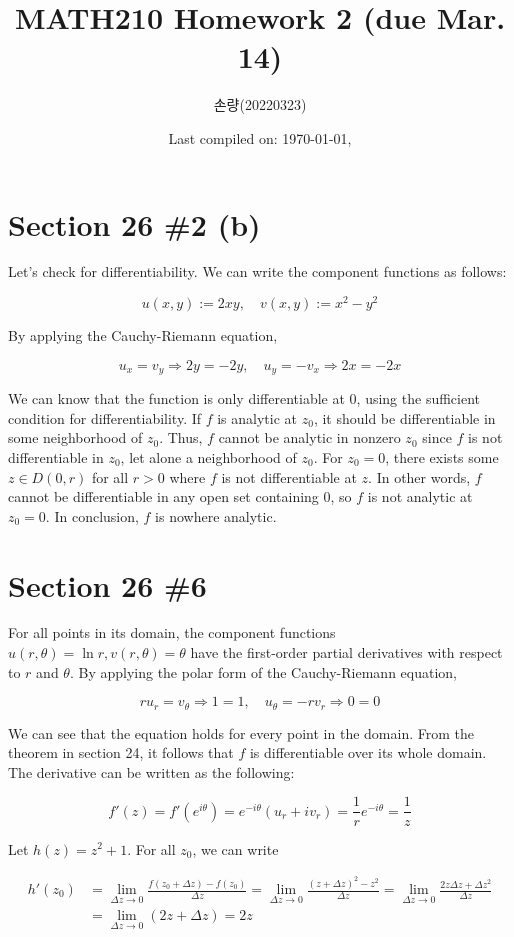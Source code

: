 \documentclass{scrartcl}
\title{MATH210 Homework 2 (due Mar. 14)}
\author{손량(20220323)}
\date{Last compiled on: \today, \currenttime}
\begin{document}
\maketitle

\section{Section 26 \#2 (b)}
Let's check for differentiability.
We can write the component functions as follows:

\[
  u(x, y) := 2xy, \quad v(x, y) := x^2 - y^2
\]

By applying the Cauchy-Riemann equation,

\[
  u_x = v_y \Longrightarrow 2y = -2y, \quad u_y = -v_x \Longrightarrow 2x = -2x
\]

We can know that the function is only differentiable at \(0\), using the sufficient condition for differentiability.
If \(f\) is analytic at \(z_0\), it should be differentiable in some neighborhood of \(z_0\).
Thus, \(f\) cannot be analytic in nonzero \(z_0\) since \(f\) is not differentiable in \(z_0\), let alone a neighborhood of \(z_0\).
For \(z_0 = 0\), there exists some \(z \in D(0, r)\) for all \(r > 0\) where \(f\) is not differentiable at \(z\).
In other words, \(f\) cannot be differentiable in any open set containing \(0\), so \(f\) is not analytic at \(z_0 = 0\).
In conclusion, \(f\) is nowhere analytic.

\section{Section 26 \#6}
For all points in its domain, the component functions \(u(r, \theta) = \ln r, v(r, \theta) = \theta\) have the first-order partial derivatives with respect to \(r\) and \(\theta\).
By applying the polar form of the Cauchy-Riemann equation,

\[
  ru_r = v_\theta \Longrightarrow 1 = 1, \quad u_\theta = -rv_r \Longrightarrow 0 = 0
\]

We can see that the equation holds for every point in the domain.
From the theorem in section 24, it follows that \(f\) is differentiable over its whole domain.
The derivative can be written as the following:

\[
  f'(z) = f'(e^{i\theta}) = e^{-i\theta} (u_r + iv_r) = \frac{1}{r} e^{-i\theta} = \frac{1}{z}
\]

Let \(h(z) = z^2 + 1\).
For all \(z_0\), we can write

\begin{align*}
  h'(z_0) &= \lim_{\Delta z \to 0} \frac{f(z_0 + \Delta z) - f(z_0)}{\Delta z} = \lim_{\Delta z \to 0} \frac{(z + \Delta z)^2 - z^2}{\Delta z} = \lim_{\Delta z \to 0} \frac{2z\Delta z + \Delta z^2}{\Delta z} \\
          &= \lim_{\Delta z \to 0} (2z + \Delta z) = 2z
\end{align*}
\end{document}
